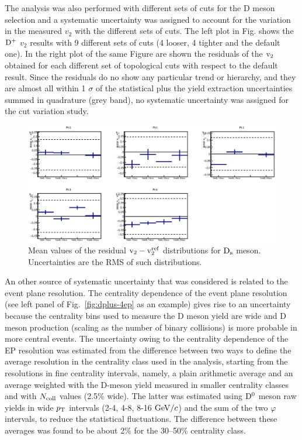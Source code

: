 The analysis was also performed with different sets of cuts for the 
D meson selection and a systematic uncertainty was assigned to account for the 
variation in the measured $v_2$ with the different sets of cuts.
The left plot in Fig. shows the ${\rm D^+}$ $v_2$ 
results with 9 different sets of cuts (4 looser, 4 tighter and the default one). 
In the right plot of the same Figure are shown the residuals of the $\rm v_2$ obtained for each different set of topological cuts with respect to the default result. Since the residuals do no show 
any particular trend or hierarchy, and they are almost all within 1
$\sigma$ of the statistical plus the yield extraction uncertainties
summed in quadrature (grey band), no systematic uncertainty was
assigned for the cut variation study. 
\begin{figure}
 \centering
 \includegraphics[width=.9\textwidth]{FigCap5/resultsComparison_sFixToMC_ExpoLin.eps}
 \caption{Mean values of the residual $\rm v_2-\rm v_2^{ref}$ distributions for ${\rm D_s}$
   meson. Uncertainties are the RMS of such distributions.}\label{fig:Dsv2residuals}
\end{figure} 


An other source of systematic uncertainty that was considered is 
related to the event plane resolution.
The centrality dependence of the event plane resolution 
(see left panel of Fig.~\ref{fig:dplus-4ep} as an example) gives rise to
an uncertainty because the centrality bins used to measure the D meson
yield are wide and D meson production (scaling as the number of binary 
collisions) is more probable in more central events.
The uncertainty owing to the centrality dependence of the EP
resolution was estimated from the difference between two ways to
define the average resolution in the centrality class used in the
analysis, starting from the resolutions in fine centrality intervals,
namely, a plain arithmetic average and an average weighted with the
D-meson yield measured in smaller centrality classes and
with $N_{\rm coll}$ values (2.5\% wide). The
latter was estimated using ${\rm D^0}$ meson raw yields in wide $p_{\rm T}$
intervals (2-4, 4-8, 8-16 $\mathrm{GeV}/c$) and the sum of the two $\varphi$
intervals, to reduce the statistical fluctuations. The difference
between these averages was found to be about 2\% for the 30–50\%
centrality class.


